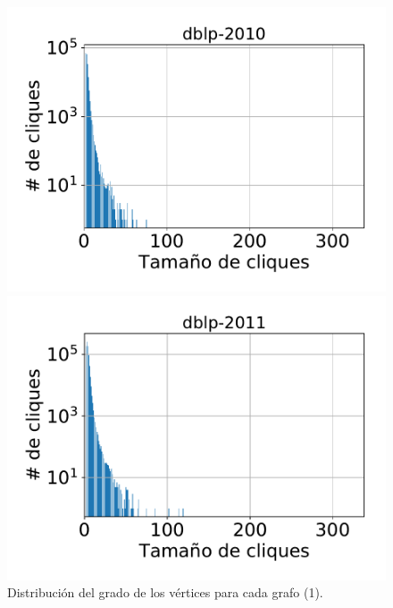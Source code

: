 \begin{frame}
\begin{figure}
    	\begin{minipage}{1\textwidth}
    		\centering
    		\begin{minipage}{0.45\textwidth}
    			\centering
    			\includegraphics[width=1\linewidth]{../img/cliqueDist2/dblp-2010.pdf}
    		\end{minipage}
    		\begin{minipage}{0.45\textwidth}
    			\centering
    			\includegraphics[width=1\linewidth]{../img/cliqueDist2/dblp-2011.pdf}
    		\end{minipage}  
    	\end{minipage}	

    \caption{Distribución del grado de los vértices para cada grafo (1).}
\end{figure}



\end{frame}
